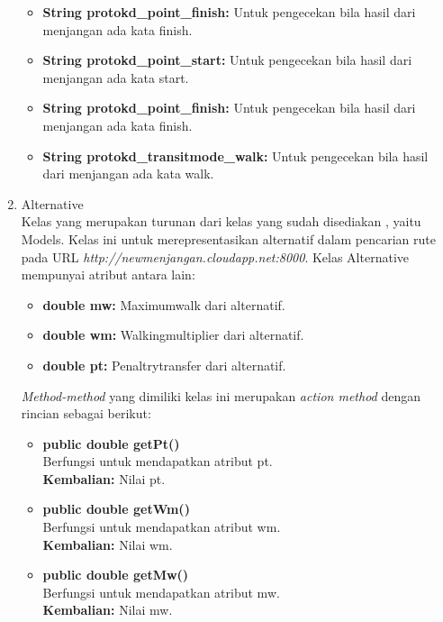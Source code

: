\begin{enumerate}
\begin{itemize}
		\item \textbf{String protokd\_point\_finish:} Untuk pengecekan bila hasil dari menjangan ada kata finish.
		\item \textbf{String protokd\_point\_start:} Untuk pengecekan bila hasil dari menjangan ada kata start.
		\item \textbf{String protokd\_point\_finish:} Untuk pengecekan bila hasil dari menjangan ada kata finish.
		\item \textbf{String protokd\_transitmode\_walk:} Untuk pengecekan bila hasil dari menjangan ada kata walk.
	\end{itemize}
	
	
	\item Alternative\\
	Kelas yang merupakan turunan dari kelas yang sudah disediakan \play, yaitu Models. Kelas ini untuk merepresentasikan alternatif dalam pencarian rute pada URL \textit{http://newmenjangan.cloudapp.net:8000}. Kelas Alternative mempunyai atribut antara lain:
	\begin{itemize}
		\item \textbf{double mw:} Maximumwalk dari alternatif.
		\item \textbf{double wm:} Walkingmultiplier dari alternatif.
		\item \textbf{double pt:}  Penaltrytransfer dari alternatif.
	\end{itemize}
	
	\textit{Method-method} yang dimiliki kelas ini merupakan \textit{action method} dengan rincian sebagai berikut:
	\begin{itemize}
		\item \textbf{public double getPt()}\\
		Berfungsi untuk mendapatkan atribut pt.\\
		\textbf{Kembalian:}  Nilai pt.
		
		\item \textbf{public double getWm()}\\
		Berfungsi untuk mendapatkan atribut wm.\\
		\textbf{Kembalian:}  Nilai wm.
		
		\item \textbf{public double getMw()}\\
		Berfungsi untuk mendapatkan atribut mw.\\
		\textbf{Kembalian:}  Nilai mw.
	\end{itemize}
	

\end{enumerate}
